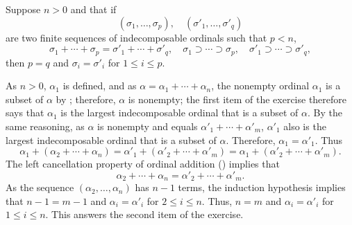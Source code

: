 \documentclass{article}
\begin{document}
\begin{solution}
  Suppose \(n > 0\) and that if
  \begin{displaymath}
    (\sigma_1, \dotsc, \sigma_p),
    \quad
    (\sigma'_1, \dotsc, \sigma'_q)
  \end{displaymath}
  are two finite sequences of indecomposable ordinals such that
  \(p < n\),
  \begin{displaymath}
    \sigma_1 + \dotsb + \sigma_p = \sigma'_1 + \dotsb + \sigma'_q,
    \quad
    \sigma_1 \supset \dotsb \supset \sigma_p,
    \quad
    \sigma'_1 \supset \dotsb \supset \sigma'_q,
  \end{displaymath}
  then \(p = q\) and \(\sigma_i = \sigma'_i\) for \(1 \leq i \leq p\).
  
  As \(n > 0\), \(\alpha_1\) is defined, and as
  \(\alpha = \alpha_1 + \dotsb + \alpha_n\), the nonempty ordinal
  \(\alpha_1\) is a subset of \(\alpha\) by ;
  therefore, \(\alpha\) is nonempty; the first item of the exercise
  therefore says that \(\alpha_1\) is the largest indecomposable
  ordinal that is a subset of \(\alpha\).  By the same reasoning, as
  \(\alpha\) is nonempty and equals
  \(\alpha'_1 + \dotsb + \alpha'_m\), \(\alpha'_1\) also is the
  largest indecomposable ordinal that is a subset of \(\alpha\).
  Therefore, \(\alpha_1 = \alpha'_1\).  Thus
  \begin{displaymath}
    \alpha_1 + (\alpha_2 + \dotsb + \alpha_n) =
    \alpha'_1 + (\alpha'_2 + \dotsb + \alpha'_m) =
    \alpha_1 + (\alpha'_2 + \dotsb + \alpha'_m).
  \end{displaymath}
  The left cancellation property of ordinal addition
  () implies that
  \begin{displaymath}
    \alpha_2 + \dotsb + \alpha_n =
    \alpha'_2 + \dotsb + \alpha'_m.
  \end{displaymath}
  As the sequence \((\alpha_2, \dotsc, \alpha_n)\) has \(n-1\) terms,
  the induction hypothesis implies that \(n-1 = m-1\) and
  \(\alpha_i = \alpha'_i\) for \(2 \leq i \leq n\).  Thus, \(n = m\)
  and \(\alpha_i = \alpha'_i\) for \(1 \leq i \leq n\).  This answers
  the second item of the exercise.


\end{solution}
\end{document}
